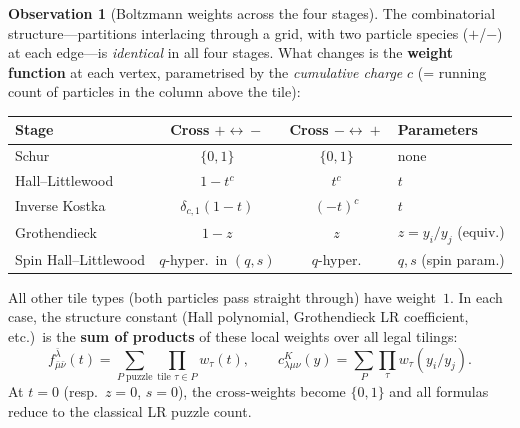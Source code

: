 \documentclass[11pt]{article}
\theoremstyle{plain}
\theoremstyle{definition}
\newtheorem{observation}[theorem]{Observation}
\theoremstyle{remark}
\begin{document}
\begin{enumerate}
  \begin{observation}[Boltzmann weights across the four stages]
  \label{obs:boltzmann-comparison}
  The combinatorial structure---partitions interlacing through a
  grid, with two particle species ($+$/$-$) at each edge---is
  \emph{identical} in all four stages.  What changes is the
  \textbf{weight function} at each vertex, parametrised by the
  \emph{cumulative charge} $c$ (= running count of particles
  in the column above the tile):
  \begin{center}
  \renewcommand{\arraystretch}{1.4}
  \begin{tabular}{l|c|c|l}
  \textbf{Stage} & \textbf{Cross $+\!\leftrightarrow\! -$}
    & \textbf{Cross $-\!\leftrightarrow\! +$}
    & \textbf{Parameters} \\ \hline
  Schur & $\{0,1\}$ & $\{0,1\}$
    & none \\
  Hall--Littlewood & $1 - t^c$ & $t^c$
    & $t$ \\
  Inverse Kostka & $\delta_{c,1}(1-t)$ & $(-t)^c$
    & $t$ \\
  Grothendieck & $1-z$ & $z$
    & $z = y_i/y_j$ (equiv.) \\
  Spin Hall--Littlewood & $q$-hyper.\ in $(q,s)$ & $q$-hyper.
    & $q, s$ (spin param.)
  \end{tabular}
  \end{center}
  All other tile types (both particles pass straight through)
  have weight~$1$.  In each case, the structure constant
  (Hall polynomial, Grothendieck LR coefficient, etc.)\ is
  the \textbf{sum of products} of these local weights over
  all legal tilings:
  \[
    f^{\bar\lambda}_{\bar\mu\bar\nu}(t)
    = \sum_{P \;\text{puzzle}} \prod_{\text{tile } \tau \in P}
    w_\tau(t),
    \qquad
    c^K_{\lambda\mu\nu}(y)
    = \sum_{P} \prod_\tau w_\tau(y_i/y_j).
  \]
  At $t = 0$ (resp.\ $z = 0$, $s = 0$), the cross-weights
  become $\{0,1\}$ and all formulas reduce to the classical
  LR puzzle count.


\end{observation}
\end{enumerate}
\end{document}
